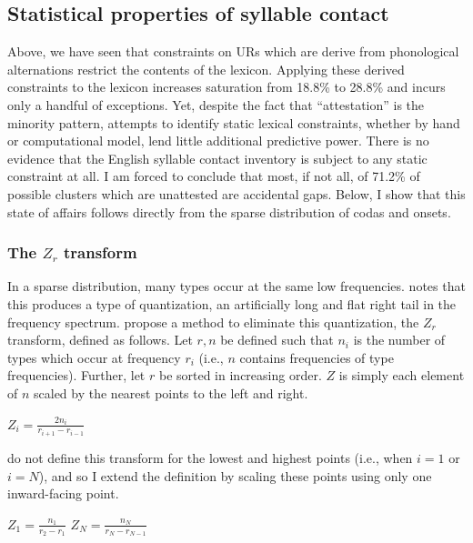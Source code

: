\subsection{Statistical properties of syllable contact}

Above, we have seen that constraints on URs which are derive from phonological alternations restrict the contents of the lexicon. Applying these derived constraints to the lexicon increases saturation from 18.8\% to 28.8\% and incurs only a handful of exceptions. Yet, despite the fact that ``attestation'' is the minority pattern, attempts to identify static lexical constraints, whether by hand or computational model, lend little additional predictive power. There is no evidence that the English syllable contact inventory is subject to any static constraint at all. I am forced to conclude that most, if not all, of 71.2\% of possible clusters which are unattested are accidental gaps. Below, I show that this state of affairs follows directly from the sparse distribution of codas and onsets. 

\subsubsection{The $Z_r$ transform}

In a sparse distribution, many types occur at the same low frequencies. \citet{Good1953} notes that this produces a type of quantization, an artificially long and flat right tail in the frequency spectrum. \citet[][29]{Church1991} propose a method to eliminate this quantization, the $Z_r$ transform, defined as follows.
Let $r, n$ be defined such that $n_i$ is the number of types which occur at frequency $r_i$ (i.e., $n$ contains frequencies of type frequencies). Further, let $r$ be sorted in increasing order. $Z$ is simply each element of $n$ scaled by the nearest points to the left and right. 

\ex $\displaystyle Z_i = \frac{2 n_i}{r_{i + 1} - r_{i - 1}}$ \xe 

\noindent
\citeauthor{Church1991} do not define this transform for the lowest and highest points (i.e., when $i = 1$ or $i = N$), and so I extend the definition by scaling these points using only one inward-facing point.

\ex $\displaystyle Z_1 = \frac{n_1}{r_2 - r_1}$ \xe
\ex $\displaystyle Z_N = \frac{n_N}{r_N - r_{N - 1}}$ \xe


